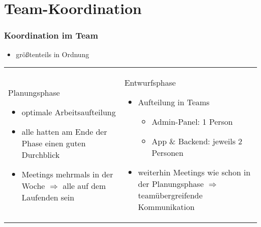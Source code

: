 \section{Team-Koordination}

\begin{frame}\frametitle{Koordination im Team}
    \begin{itemize}
        \item größtenteils in Ordnung
    \end{itemize}
        	\begin{tabular}{l l}
        	\begin{tcolorbox}[width=.4\textwidth]
        	Planungsphase
        	\begin{itemize}
        		\item optimale Arbeitsaufteilung
        		\item alle hatten am Ende der Phase einen guten Durchblick
        		\item Meetings mehrmals in der Woche $\Rightarrow$ alle auf dem Laufenden sein
        	\end{itemize}
        	\end{tcolorbox} &
        	\begin{tcolorbox}[width=.5\textwidth]
        	Entwurfsphase
        	\begin{itemize}
        		\item Aufteilung in Teams
        		\begin{itemize}
        			\item Admin-Panel: 1 Person
        			\item App \& Backend: jeweils 2 Personen
        		\end{itemize}
        	\item weiterhin Meetings wie schon in der Planungsphase $\Rightarrow$ teamübergreifende Kommunikation
     	\end{itemize}
        	\end{tcolorbox} \\
        	\end{tabular}
\end{frame}

